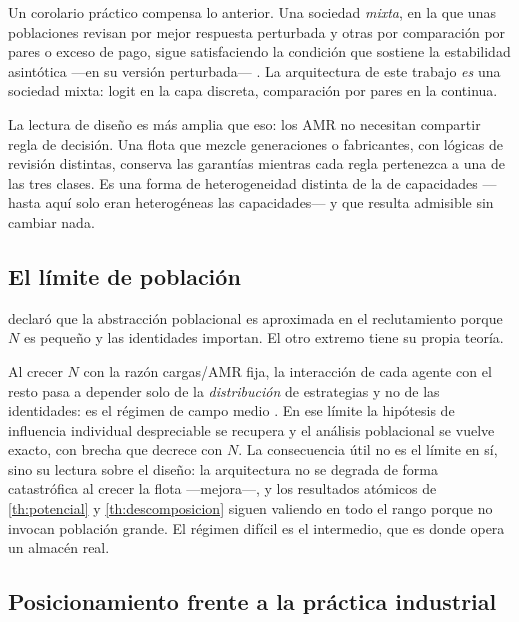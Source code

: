 \begin{observacion}
\label{obs:sociedad-mixta}
Un corolario práctico compensa lo anterior. Una sociedad \emph{mixta}, en la que
unas poblaciones revisan por mejor respuesta perturbada y otras por comparación
por pares o exceso de pago, sigue satisfaciendo la condición que sostiene la
estabilidad asintótica —en su versión perturbada—
\cite{martinezPiazuelo2025gne}. La arquitectura de este trabajo \emph{es} una
sociedad mixta: logit en la capa discreta, comparación por pares en la continua.

La lectura de diseño es más amplia que eso: los AMR no necesitan compartir regla
de decisión. Una flota que mezcle generaciones o fabricantes, con lógicas de
revisión distintas, conserva las garantías mientras cada regla pertenezca a una
de las tres clases. Es una forma de heterogeneidad distinta de la de capacidades —hasta aquí solo eran heterogéneas las capacidades— y que resulta
admisible sin cambiar nada.
\end{observacion}

\subsection{El límite de población}

 declaró que la abstracción poblacional es
aproximada en el reclutamiento porque $N$ es pequeño y las identidades importan.
El otro extremo tiene su propia teoría.

\begin{observacion}
\label{obs:campo-medio}
Al crecer $N$ con la razón cargas/AMR fija, la interacción de cada agente con el
resto pasa a depender solo de la \emph{distribución} de estrategias y no de las
identidades: es el régimen de campo medio \cite{tembine2021meanfield}. En ese
límite la hipótesis de influencia individual despreciable se recupera y el
análisis poblacional se vuelve exacto, con brecha que decrece con $N$. La
consecuencia útil no es el límite en sí, sino su lectura sobre el diseño: la
arquitectura no se degrada de forma catastrófica al crecer la flota —mejora—, y
los resultados atómicos de \cref{th:potencial} y \cref{th:descomposicion} siguen
valiendo en todo el rango porque no invocan población grande. El régimen difícil
es el intermedio, que es donde opera un almacén real.
\end{observacion}

\subsection{Posicionamiento frente a la práctica industrial}

